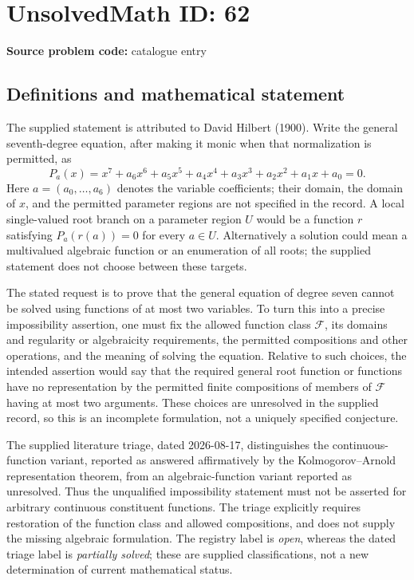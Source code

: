 \documentclass[11pt]{article}
\begin{document}
\section*{UnsolvedMath ID: 62}
\textbf{Source problem code:} catalogue entry
\subsection{Definitions and mathematical statement}
The supplied statement is attributed to David Hilbert (1900). Write the general seventh-degree equation, after making it monic when that normalization is permitted, as
\[
 P_a(x)=x^7+a_6x^6+a_5x^5+a_4x^4+a_3x^3+a_2x^2+a_1x+a_0=0.
\]
Here $a=(a_0,\ldots,a_6)$ denotes the variable coefficients; their domain, the domain of $x$, and the permitted parameter regions are not specified in the record. A local single-valued root branch on a parameter region $U$ would be a function $r$ satisfying $P_a(r(a))=0$ for every $a\in U$. Alternatively a solution could mean a multivalued algebraic function or an enumeration of all roots; the supplied statement does not choose between these targets.

The stated request is to prove that the general equation of degree seven cannot be solved using functions of at most two variables. To turn this into a precise impossibility assertion, one must fix the allowed function class $\mathcal F$, its domains and regularity or algebraicity requirements, the permitted compositions and other operations, and the meaning of solving the equation. Relative to such choices, the intended assertion would say that the required general root function or functions have no representation by the permitted finite compositions of members of $\mathcal F$ having at most two arguments. These choices are unresolved in the supplied record, so this is an incomplete formulation, not a uniquely specified conjecture.

The supplied literature triage, dated 2026-08-17, distinguishes the continuous-function variant, reported as answered affirmatively by the Kolmogorov--Arnold representation theorem, from an algebraic-function variant reported as unresolved. Thus the unqualified impossibility statement must not be asserted for arbitrary continuous constituent functions. The triage explicitly requires restoration of the function class and allowed compositions, and does not supply the missing algebraic formulation. The registry label is \emph{open}, whereas the dated triage label is \emph{partially solved}; these are supplied classifications, not a new determination of current mathematical status.
\end{document}
